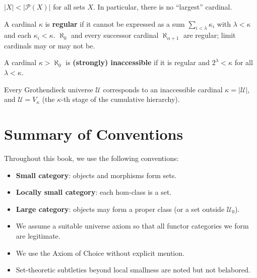 \begin{theorem}[Cantor]
$|X| < |\mathcal{P}(X)|$ for all sets $X$. In particular, there is no ``largest'' cardinal.
\end{theorem}

\begin{definition}
A cardinal $\kappa$ is \textbf{regular} if it cannot be expressed as a sum $\sum_{i < \lambda} \kappa_i$ with $\lambda < \kappa$ and each $\kappa_i < \kappa$. $\aleph_0$ and every successor cardinal $\aleph_{\alpha+1}$ are regular; limit cardinals may or may not be.

A cardinal $\kappa > \aleph_0$ is \textbf{(strongly) inaccessible} if it is regular and $2^\lambda < \kappa$ for all $\lambda < \kappa$.
\end{definition}

Every Grothendieck universe $\mathcal{U}$ corresponds to an inaccessible cardinal $\kappa = |\mathcal{U}|$, and $\mathcal{U} = V_\kappa$ (the $\kappa$-th stage of the cumulative hierarchy).

\section{Summary of Conventions}

Throughout this book, we use the following conventions:
\begin{itemize}
  \item \textbf{Small category}: objects and morphisms form sets.
  \item \textbf{Locally small category}: each hom-class is a set.
  \item \textbf{Large category}: objects may form a proper class (or a set outside $\mathcal{U}_0$).
  \item We assume a suitable universe axiom so that all functor categories we form are legitimate.
  \item We use the Axiom of Choice without explicit mention.
  \item Set-theoretic subtleties beyond local smallness are noted but not belabored.
\end{itemize}

